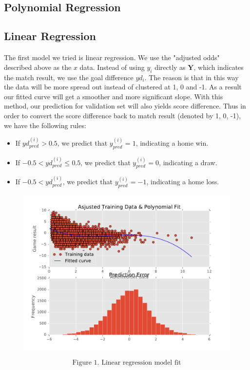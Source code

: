 \documentclass[12pt]{article}
\begin{document}
\subsection{Polynomial Regression}

\subsection{Linear Regression}

\paragraph{}
The first model we tried is linear regression. We use the "adjusted odds" described above as the $x$ data. Instead of using $y_i$ directly as $\mathbf{Y}$, which indicates the match result, we use the goal difference $yd_i$. The reason is that in this way the data will be more spread out instead of clustered at 1, 0 and -1. As a result our fitted curve will get a smoother and more significant slope. With this method, our prediction for validation set will also yields score difference. Thus in order to convert the score difference back to match result (denoted by 1, 0, -1), we have the following rules:
\begin{itemize}
 \item If $yd_{pred}^{(i)} > 0.5$, we predict that $y_{pred}^{(i)} = 1$, indicating a home win.
 \item If $-0.5 < yd_{pred}^{(i)} \leq 0.5$, we predict that $y_{pred}^{(i)} = 0$, indicating a draw.
 \item If $-0.5 < yd_{pred}^{(i)}$, we predict that $y_{pred}^{(i)} = -1$, indicating a home loss.
\end{itemize}

\begin{figure}[!ht]
\centering
\includegraphics[scale=0.3]{"linreg"}
\end{figure}
\[ \text{Figure 1. Linear regression model fit} \]
\end{document}
